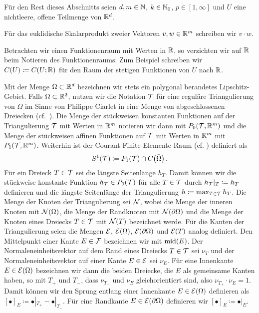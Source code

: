Für den Rest dieses Abschnitts seien $d,m\in\mathbb{N}$, $k\in\mathbb{N}_0$,
$p\in[1,\infty]$ und $U$ eine nichtleere, offene Teilmenge von $\mathbb{R}^d$.

Für das euklidische Skalarprodukt zweier Vektoren $v,w\in \mathbb{R}^m$ schreiben wir
$v\cdot w$.

Betrachten wir einen Funktionenraum mit Werten in $\mathbb{R}$, so verzichten wir auf
$\mathbb{R}$ beim Notieren des Funktionenraums. Zum Beispiel schreiben wir 
$C(U)\coloneqq C(U;\mathbb{R})$ für den Raum der stetigen Funktionen von $U$ nach
$\mathbb{R}$.


Mit der Menge $\Omega\subset\mathbb{R}^d$ bezeichnen wir stets ein polygonal
berandetes Lipschitz-Gebiet. 
Falls $\Omega\subset\mathbb{R}^2$, nutzen wir die Notation $\mathcal{T}$ für eine reguläre
Triangulierung von $\Omega$ im Sinne von Philippe Ciarlet in eine Menge von
abgeschlossenen Dreiecken (cf.\ \cites[34]{Car09b}[345]{CGR12}[8]{CGKNRR10}).
Die Menge der stückweisen konstanten Funktionen auf der Triangulierung $\mathcal{T}$
mit Werten in $\mathbb{R}^m$ notieren wir dann mit $ P_0\!\left(\mathcal{T},\mathbb{R}^m\right)$
und die Menge der stückweisen affinen Funktionen auf $\mathcal{T}$ mit Werten in
$\mathbb{R}^m$ mit $ P_1\!\left(\mathcal{T},\mathbb{R}^m\right)$. 
Weiterhin ist der Courant-Finite-Elemente-Raum (cf. \cite[12]{CGKNRR10})
definiert als
\begin{align*}
  S^1(\mathcal{T})\coloneqq P_1(\mathcal{T})\cap C\!\left(\bar\Omega\right).
\end{align*}
Für ein Dreieck $T\in\mathcal{T}$ sei die längste Seitenlänge $h_T$. 
Damit können wir die stückweise konstante Funktion $h_{\mathcal{T}}\in P_0(\mathcal{T})$
für alle $T\in\mathcal{T}$ durch $h_{\mathcal{T}}|_T\coloneqq h_T$ definieren und die längste
Seitenlänge der Triangulierung $h\coloneqq\max_{T\in\mathcal{T}}h_T$.
Die Menge der Knoten der Triangulierung sei $\mathcal{N}$, wobei die Menge der
inneren Knoten mit $\mathcal{N}(\Omega)$, die Menge der Randknoten mit
$\mathcal{N}(\partial\Omega)$ und die Menge der Knoten eines Dreiecks $T\in\mathcal{T}$ mit
$\mathcal{N}(T)$ bezeichnet werde. 
Für die Kanten der Triangulierung seien die Mengen $\mathcal{E}$, $\mathcal{E}(\Omega)$,
$\mathcal{E}(\partial\Omega)$ und $\mathcal{E}(T)$ analog definiert. 
Den Mittelpunkt einer Kante $E\in\mathcal{F}$ bezeichnen wir mit $\textup{mid}(E)$.
Der Normaleneinheitsvektor auf dem Rand eines Dreiecks $T\in\mathcal{T}$ sei
$\nu_T$ und der Normaleneinheitsvektor auf einer Kante $E\in\mathcal{E}$ sei
$\nu_E$. 
Für eine Innenkante $E\in\mathcal{E}(\Omega)$ bezeichnen wir dann die beiden
Dreiecke, die $E$ als gemeinsame Kanten haben, so mit $T_+$ und $T_-$, dass
$\nu_{T_+}$ und $\nu_E$ gleichorientiert sind, also $\nu_{T_+}\cdot\nu_E=1$.
Damit können wir den Sprung entlang einer Innenkante $E\in\mathcal{E}(\Omega)$
definieren als $[\bullet]_E\coloneqq \bullet|_{T_+} -\bullet|_{T_-}$.
Für eine Randkante $E\in\mathcal{E}(\partial\Omega)$ definieren wir
$[\bullet]_E\coloneqq \bullet|_E$.

